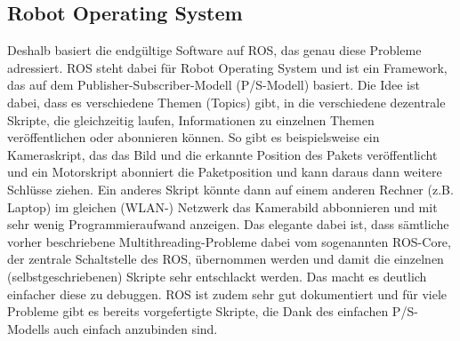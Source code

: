 \subsection{Robot Operating System}
Deshalb basiert die endgültige Software auf ROS, das genau diese Probleme adressiert. ROS steht dabei für Robot Operating System und ist ein Framework, das auf dem Publisher-Subscriber-Modell (P/S-Modell) basiert. Die Idee ist dabei, dass es verschiedene Themen (Topics) gibt, in die verschiedene dezentrale Skripte, die gleichzeitig laufen, Informationen zu einzelnen Themen veröffentlichen oder abonnieren können. So gibt es beispielsweise ein Kameraskript, das das Bild und die erkannte Position des Pakets veröffentlicht und ein Motorskript abonniert die Paketposition und kann daraus dann weitere Schlüsse ziehen. Ein anderes Skript könnte dann auf einem anderen Rechner (z.B. Laptop) im gleichen (WLAN-) Netzwerk das Kamerabild abbonnieren und mit sehr wenig Programmieraufwand anzeigen. Das elegante dabei ist, dass sämtliche vorher beschriebene Multithreading-Probleme dabei vom sogenannten ROS-Core, der zentrale Schaltstelle des ROS, übernommen werden und damit die einzelnen (selbstgeschriebenen) Skripte sehr entschlackt werden. Das macht es deutlich einfacher diese zu debuggen. ROS ist zudem sehr gut dokumentiert und für viele Probleme gibt es bereits vorgefertigte Skripte, die Dank des einfachen P/S-Modells auch einfach anzubinden sind.

